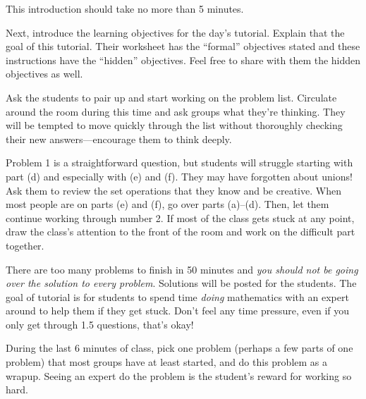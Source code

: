 		This introduction should take no more than 5 minutes.

		Next, introduce the learning objectives for the day's tutorial. Explain
		that the goal of this tutorial. Their worksheet has the ``formal'' objectives
		stated and these instructions have the ``hidden'' objectives. Feel free
		to share with them the hidden objectives as well.

		Ask the students to pair up and
		start working on the problem list. Circulate around the room during
		this time and ask groups what they're thinking. They will be tempted
		to move quickly through the list without thoroughly checking their
		new answers---encourage them to think deeply.

		Problem 1 is a straightforward question, but students will struggle starting
		with part (d) and especially with (e) and (f). They may have forgotten about unions! Ask
		them to review the set operations that they know and be creative. When most people are on
		parts (e) and (f), go over parts (a)--(d). Then, let them continue working through number 2.
		If most of the class gets stuck at any point, draw the class's attention to the front
		of the room and work on the difficult part together.

		There are too many problems to finish in 50 minutes and \emph{you should not be going
		over the solution to every problem}. Solutions will be posted for the students. The goal
		of tutorial is for students to spend time \emph{doing} mathematics with an expert around
		to help them if they get stuck. Don't feel any time pressure, even if you only get through 1.5
		questions, that's okay!

		During the last 6 minutes of class, pick one problem (perhaps a few parts of one problem)
		that most groups have at least started, and do this problem as a wrapup. Seeing an expert do the
		problem is the student's reward for working so hard.

